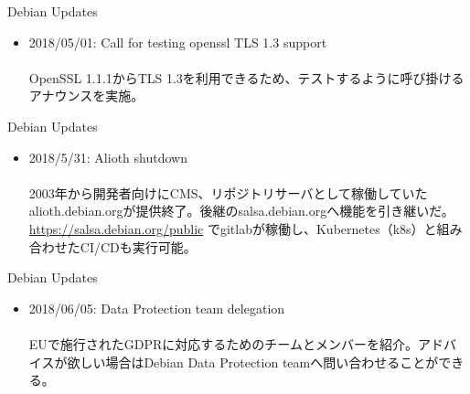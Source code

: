 \documentclass[cjk,dvipdfmx,10pt,compress,%
hyperref={bookmarks=true,bookmarksnumbered=true,bookmarksopen=false,%
colorlinks=false,%
pdftitle={第 132 回 関西 Debian 勉強会},%
pdfauthor={かわだ},%
pdfsubject={資料},%
}]{beamer}
\begin{document}
\begin{frame}{Debian Updates}%
\begin{itemize}
\item 2018/05/01: Call for testing openssl TLS 1.3 support\\
\ \\
  \small{OpenSSL 1.1.1からTLS 1.3を利用できるため、テストするように呼び掛けるアナウンスを実施。}
%
\end{itemize}
\end{frame}

\begin{frame}{Debian Updates}%
\begin{itemize}
\item 2018/5/31:  Alioth shutdown\\
\ \\
  \small{2003年から開発者向けにCMS、リポジトリサーバとして稼働していたalioth.debian.orgが提供終了。後継のsalsa.debian.orgへ機能を引き継いだ。\url{https://salsa.debian.org/public} でgitlabが稼働し、Kubernetes（k8s）と組み合わせたCI/CDも実行可能。}
\end{itemize}
\end{frame}

\begin{frame}{Debian Updates}%
\begin{itemize}
\item 2018/06/05:  Data Protection team delegation\\
\ \\
\small{EUで施行されたGDPRに対応するためのチームとメンバーを紹介。アドバイスが欲しい場合はDebian Data Protection teamへ問い合わせることができる。}
\end{itemize}
\end{frame}
\end{document}
